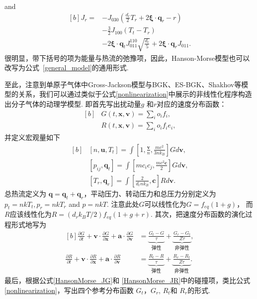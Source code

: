 and
\begin{equation}\label{HansonMorse_JR}
\begin{aligned}[b]
{J}_r=& -{J}_{030}\left(\frac{d_r}{2}T_{r}+2\bm{\xi}\cdot\bm{q}_{r}-r\right)\\
&-\frac{3}{2}J_{100}(T_{t}-T_{r})\\
& 
-2\bm{\xi}\cdot\bm{q}_{t}J_{011}^{110}\sqrt{\frac{d_{r}}{5}} +2\bm{\xi}\cdot\bm{q}_{r} J_{011}.
\end{aligned}
\end{equation}
很明显，带下括号的项为能量与热流的弛豫项，因此，Hanson-Morse模型也可以改写为公式~\eqref{general_model}的通用形式.

至此，注意到单原子气体中Gross-Jackson模型与BGK、ES-BGK、Shakhov等模型的关系，我们可以通过类似于公式\eqref{nonlinearization}中展示的非线性化程序构造出分子气体的动理学模型. 即首先写出扰动量$g$ 和$r$对应的速度分布函数：
\begin{equation}
\begin{aligned}[b]
&G(t,\bm{x},\bm{v})=\sum_i{o_i}{f_i},\\
&R(t,\bm{x},\bm{v})=\sum_i{o_i}{f_i}e_i,
\end{aligned}
\end{equation}
并定义宏观量如下
\begin{equation}\label{macro_molecular}
\begin{aligned}[b]
&[n,\bm{u},T_t]=\int{}\left[1,\frac{\bm{v}}{n}, \frac{mc^2}{3nk_B}\right]Gd\bm{v},
\\
&[p_{ij},\bm{q}_{t}]=\int{}\left[mc_i{c_j},\frac{{mc^2}\bm{c}}{2}\right]Gd\bm{v},
\\
&[T_r,\bm{q}_{r}]=\int{}\left[\frac{2}{d_rnk_B},\bm{c}\right]R d\bm{v}.
\end{aligned}
\end{equation}
总热流定义为 $\bm{q}=\bm{q}_{t}+\bm{q}_{r}$，平动压力、转动压力和总压力分别定义为 $p_t=nkT_t, p_r=nkT_r$ and $p=nkT$.   注意此处$G$可以线性化为$G=f_{eq}(1+g)$， 而$R$应该线性化为$R=(d_rk_BT/2)f_{eq}(1+g+r)$.
其次，把速度分布函数的演化过程形式地写为
\begin{equation}\label{general_model}
\begin{aligned}[b]
\frac{\partial G}{\partial t}+\bm{v}\cdot \frac{\partial G}{\partial \bm{x}} +\bm{a}\cdot \frac{\partial G}{\partial \bm{v}}&
=\underbrace{\frac{G_t-G}{ \tau  }}_{\text{弹性}}+\underbrace{\frac{G_r-G_t}{ Z\tau}}_{\text{非弹性}},\\
\frac{\partial R}{\partial t}+\bm{v}\cdot \frac{\partial R}{\partial \bm{x}} +\bm{a}\cdot \frac{\partial R}{\partial \bm{v}}&
=\underbrace{\frac{R_t-R}{ \tau  }}_{\text{弹性}}+\underbrace{\frac{R_r-R_t}{ Z\tau}}_{\text{非弹性}}.
\end{aligned}
\end{equation}
最后，根据公式\eqref{HansonMorse_JG}和 \eqref{HansonMorse_JR}中的碰撞项，类比公式\eqref{nonlinearization}，写出四个参考分布函数
$G_t$，$G_r$, $R_t$和 $R_r$的形式. 

